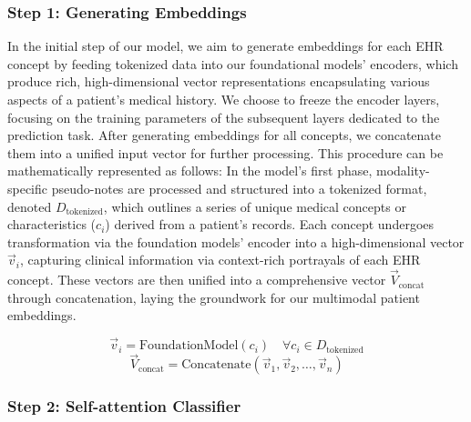 \documentclass{article}
\theoremstyle{plain}
\theoremstyle{definition}
\theoremstyle{remark}
\begin{document}
\subsubsection{Step 1: Generating Embeddings}

In the initial step of our model, we aim to generate embeddings for each EHR concept by feeding tokenized data into our foundational models' encoders, which produce rich, high-dimensional vector representations encapsulating various aspects of a patient's medical history. We choose to freeze the encoder layers, focusing on the training parameters of the subsequent layers dedicated to the prediction task. After generating embeddings for all concepts, we concatenate them into a unified input vector for further processing. This procedure can be mathematically represented as follows: In the model's first phase, modality-specific pseudo-notes are processed and structured into a tokenized format, denoted $D_{\text{tokenized}}$, which outlines a series of unique medical concepts or characteristics ($c_i$) derived from a patient's records. Each concept undergoes transformation via the foundation models' encoder into a high-dimensional vector $\vec{v}_i$, capturing clinical information via context-rich portrayals of each EHR concept. These vectors are then unified into a comprehensive vector $\vec{V}_{\text{concat}}$ through concatenation, laying the groundwork for our multimodal patient embeddings.

\begin{equation}
    \vec{v}_i = \text{FoundationModel}(c_i) \quad \forall c_i \in D_{\text{tokenized}}
\end{equation}
\begin{equation}
    \vec{V}_{\text{concat}} = \text{Concatenate}(\vec{v}_1, \vec{v}_2, \ldots, \vec{v}_n)
\end{equation}

\subsubsection{Step 2: Self-attention Classifier}
\end{document}
